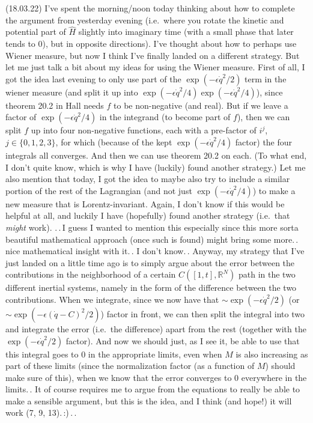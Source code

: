 \documentclass{report}
\begin{document}
(18.03.22) I've spent the morning/noon today thinking about how to complete the argument from yesterday evening (i.e.\ where you rotate the kinetic and potential part of $\hat H$ slightly into imaginary time (with a small phase that later tends to 0), but in opposite directions). I've thought about how to perhaps use Wiener measure, but now I think I've finally landed on a different strategy. But let me just talk a bit about my ideas for using the Wiener measure. First of all, I got the idea last evening to only use part of the $\exp(-\epsilon \dot q^2/2)$ term in the wiener measure (and split it up into $\exp(-\epsilon \dot q^2/4)\exp(-\epsilon \dot q^2/4)$), since theorem 20.2 in Hall needs $f$ to be non-negative (and real). But if we leave a factor of $\exp(-\epsilon \dot q^2/4)$ in the integrand (to become part of $f$), then we can split $f$ up into four non-negative functions, each with a pre-factor of $i^j$, $j\in \{0,1,2,3\}$, for which (because of the kept $\exp(-\epsilon \dot q^2/4)$ factor) the four integrals all converges. And then we can use theorem 20.2 on each. (To what end, I don't quite know, which is why I have (luckily) found another strategy.) Let me also mention that today, I got the idea to maybe also try to include a similar portion of the rest of the Lagrangian (and not just $\exp(-\epsilon \dot q^2/4)$) to make a new measure that is Lorentz-invariant. Again, I don't know if this would be helpful at all, and luckily I have (hopefully) found another strategy (i.e.\ that \emph{might} work). .\,.\,I guess I wanted to mention this especially since this more sorta beautiful mathematical approach (once such is found) might bring some more.\,. nice mathematical insight with it.\,. I don't know.\,. Anyway, my strategy that I've just landed on a little time ago is to simply argue about the error between the contributions in the neighborhood of a certain $C([1,t], \mathbb{R}^N)$ path in the two different inertial systems, namely in the form of the difference between the two contributions. When we integrate, since we now have that $\sim \exp(-\epsilon \dot q^2/2)$ (or $\sim \exp(-\epsilon (\dot q- C)^2/2)$) factor in front, we can then split the integral into two and integrate the error (i.e.\ the difference) apart from the rest (together with the $\exp(-\epsilon \dot q^2/2)$ factor). And now we should just, as I see it, be able to use that this integral goes to 0 in the appropriate limits, even when $M$ is also increasing as part of these limits (since the normalization factor (as a function of $M$) should make sure of this), when we know that the error converges to 0 everywhere in the limits.\,. It of course requires me to argue from the equations to really be able to make a sensible argument, but this is the idea, and I think (and hope!) it will work (7, 9, 13).\,:)\,.\,. 
\end{document}
